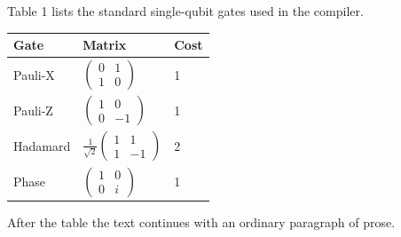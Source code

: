 \documentclass{article}
\begin{document}
Table 1 lists the standard single-qubit gates used in the compiler.

\begin{table}[h]\centering
\begin{tabular}{lll}
\toprule
Gate & Matrix & Cost \\
\midrule
Pauli-X & $\begin{pmatrix}0&1\\1&0\end{pmatrix}$ & 1 \\[8pt]
Pauli-Z & $\begin{pmatrix}1&0\\0&-1\end{pmatrix}$ & 1 \\[8pt]
Hadamard & $\frac{1}{\sqrt2}\begin{pmatrix}1&1\\1&-1\end{pmatrix}$ & 2 \\[8pt]
Phase & $\begin{pmatrix}1&0\\0&i\end{pmatrix}$ & 1 \\
\bottomrule
\end{tabular}
\end{table}
After the table the text continues with an ordinary paragraph of prose.
\end{document}
